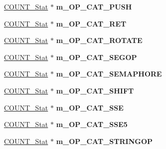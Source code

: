 \begin{DoxyCompactItemize}
\item 
\hypertarget{classall__stats__c_a5cf9a3d66c5993a23bd617d329b789a1}{
\hyperlink{classCOUNT__Stat}{COUNT\_\-Stat} $\ast$ {\bfseries m\_\-OP\_\-CAT\_\-PUSH}}
\label{classall__stats__c_a5cf9a3d66c5993a23bd617d329b789a1}

\item 
\hypertarget{classall__stats__c_a63a2793f8d0a97502da8b0bc351ae1cc}{
\hyperlink{classCOUNT__Stat}{COUNT\_\-Stat} $\ast$ {\bfseries m\_\-OP\_\-CAT\_\-RET}}
\label{classall__stats__c_a63a2793f8d0a97502da8b0bc351ae1cc}

\item 
\hypertarget{classall__stats__c_acaa5bcce19a2fd6719613d774dcb59c8}{
\hyperlink{classCOUNT__Stat}{COUNT\_\-Stat} $\ast$ {\bfseries m\_\-OP\_\-CAT\_\-ROTATE}}
\label{classall__stats__c_acaa5bcce19a2fd6719613d774dcb59c8}

\item 
\hypertarget{classall__stats__c_a8b978848fbfc08f151c908da3ec96b11}{
\hyperlink{classCOUNT__Stat}{COUNT\_\-Stat} $\ast$ {\bfseries m\_\-OP\_\-CAT\_\-SEGOP}}
\label{classall__stats__c_a8b978848fbfc08f151c908da3ec96b11}

\item 
\hypertarget{classall__stats__c_a0d2714b81c5279c0806834acec4f5b81}{
\hyperlink{classCOUNT__Stat}{COUNT\_\-Stat} $\ast$ {\bfseries m\_\-OP\_\-CAT\_\-SEMAPHORE}}
\label{classall__stats__c_a0d2714b81c5279c0806834acec4f5b81}

\item 
\hypertarget{classall__stats__c_a64171e7dcb45591d8ab17eafce6b7100}{
\hyperlink{classCOUNT__Stat}{COUNT\_\-Stat} $\ast$ {\bfseries m\_\-OP\_\-CAT\_\-SHIFT}}
\label{classall__stats__c_a64171e7dcb45591d8ab17eafce6b7100}

\item 
\hypertarget{classall__stats__c_af94776638afedae50ad146a37566cb2e}{
\hyperlink{classCOUNT__Stat}{COUNT\_\-Stat} $\ast$ {\bfseries m\_\-OP\_\-CAT\_\-SSE}}
\label{classall__stats__c_af94776638afedae50ad146a37566cb2e}

\item 
\hypertarget{classall__stats__c_afdb8963db0e8f9535f5c8b68431375b4}{
\hyperlink{classCOUNT__Stat}{COUNT\_\-Stat} $\ast$ {\bfseries m\_\-OP\_\-CAT\_\-SSE5}}
\label{classall__stats__c_afdb8963db0e8f9535f5c8b68431375b4}

\item 
\hypertarget{classall__stats__c_a7db44078f842529c3d05f09176fe8312}{
\hyperlink{classCOUNT__Stat}{COUNT\_\-Stat} $\ast$ {\bfseries m\_\-OP\_\-CAT\_\-STRINGOP}}
\label{classall__stats__c_a7db44078f842529c3d05f09176fe8312}


\end{DoxyCompactItemize}
